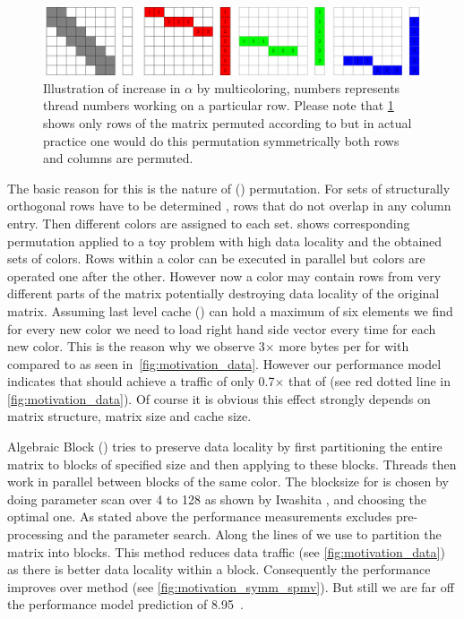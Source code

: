   \begin{figure}[htbp]
  	\centering
  	\includegraphics[scale=0.45]{pics/mc_alpha_problem/mc_alpha_unsymm}
  	\caption{Illustration of increase in $\alpha$ by multicoloring, numbers represents thread numbers working on a particular row. Please note that \cref{fig:mc_alpha} shows only rows of the matrix permuted according to \MCfull but in actual practice one would do this permutation symmetrically \ie both rows and columns are permuted.}
  	\label{fig:mc_alpha}
  \end{figure}
  
  The basic reason for this is the nature of \MCfull (\MC) permutation. For \DTWO \MC sets of structurally orthogonal rows have to be determined \cite{dist_k_def}, \ie rows that do not overlap in any column entry. Then different colors are assigned to each set.  shows corresponding permutation applied to a toy problem with high data locality and the obtained sets of colors. Rows within a color can be executed in parallel but colors are operated one after the other. However now a color may contain rows from very different parts of the matrix potentially destroying data locality of the original matrix.  Assuming last level cache (\LLC) can hold a maximum of six elements we find for every new color we need to load right hand side vector every time for each new color. This is the reason why we observe 3$\times$ more bytes per \nnz for \SymmSpmv with \MC compared to \SpMV as seen in~\cref{fig:motivation_data}.  However our performance model indicates that \SymmSpmv should achieve a traffic of only 0.7$\times$ that of \SpMV (see red dotted line in \cref{fig:motivation_data}). Of course it is obvious this effect strongly depends on matrix structure, matrix size and cache size. 
      
  
  Algebraic Block \MCfull (\ABMC) tries to preserve data locality by first partitioning the entire matrix to blocks of specified size and then applying \MCfull to these blocks. Threads then work in parallel between blocks of the same color. The blocksize for \ABMC is chosen by doing parameter scan over 4 to 128 as shown by Iwashita \etal \cite{ABMC}, and choosing the optimal one. As stated above the performance measurements excludes pre-processing and the parameter search. Along the lines of \cite{Park_HPCG} we use \METIS \cite{METIS} to partition the matrix into blocks.  This method reduces data traffic (see \cref{fig:motivation_data}) as there is better data locality within a block. Consequently the performance improves over \MC method (see \cref{fig:motivation_symm_spmv}). But still we are far off the performance model prediction of 8.95~\GF.
  
